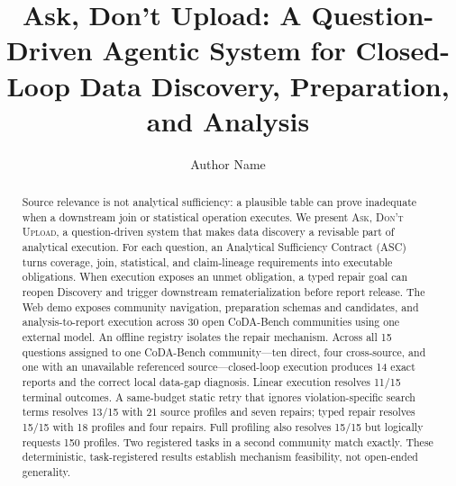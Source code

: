 \documentclass[sigconf, nonacm]{acmart}
\newcommand{\systemname}{\textsc{Ask, Don't Upload}}
\begin{document}
\title{Ask, Don't Upload: A Question-Driven Agentic System for Closed-Loop
Data Discovery, Preparation, and Analysis}

\author{Author Name}

\begin{abstract}
Source relevance is not analytical sufficiency: a plausible table can prove
inadequate when a downstream join or statistical operation executes.  We
present \systemname, a question-driven system that makes data discovery a
revisable part of analytical execution.  For each question, an Analytical
Sufficiency Contract (ASC) turns coverage, join, statistical, and claim-lineage
requirements into executable obligations.  When execution exposes an unmet
obligation, a typed repair goal can reopen Discovery and trigger downstream
rematerialization before report release.  The Web demo exposes community
navigation, preparation schemas and candidates, and analysis-to-report execution
across 30 open CoDA-Bench communities using one external model.
An offline registry isolates the repair mechanism.  Across
all 15 questions assigned to one CoDA-Bench community---ten direct, four
cross-source, and one with an unavailable referenced source---closed-loop
execution produces 14 exact reports and the correct local data-gap diagnosis.
Linear execution resolves 11/15 terminal outcomes.  A same-budget static retry
that ignores violation-specific search terms resolves 13/15 with 21 source
profiles and seven repairs; typed repair resolves 15/15 with 18 profiles and
four repairs.  Full profiling also resolves 15/15 but logically requests 150
profiles.  Two registered tasks in a second community match exactly.  These
deterministic, task-registered results establish mechanism feasibility, not
open-ended generality.
\end{abstract}

\maketitle

\vldbtopmatter
\end{document}
